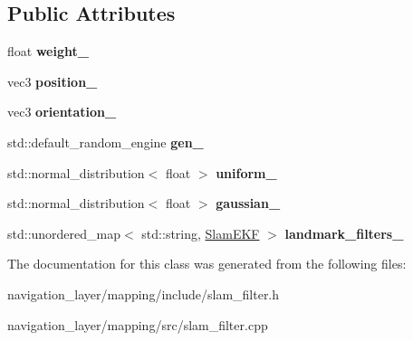 \subsection*{Public Attributes}
\begin{DoxyCompactItemize}
\item 
\mbox{\label{classmapping_1_1SlamParticle_aae4caa21a4aa9866bb63bddde3e16bb2}} 
float {\bfseries weight\+\_\+}
\item 
\mbox{\label{classmapping_1_1SlamParticle_a04c48dccf2bf33aa6761a38d9d289cef}} 
vec3 {\bfseries position\+\_\+}
\item 
\mbox{\label{classmapping_1_1SlamParticle_a989e2db13f8532c795ec423e70bd5133}} 
vec3 {\bfseries orientation\+\_\+}
\item 
\mbox{\label{classmapping_1_1SlamParticle_a498c90169a53f012cc2018bd6e2472f3}} 
std\+::default\+\_\+random\+\_\+engine {\bfseries gen\+\_\+}
\item 
\mbox{\label{classmapping_1_1SlamParticle_a8dd5b4d4a029b82c4e4277b76b49f625}} 
std\+::normal\+\_\+distribution$<$ float $>$ {\bfseries uniform\+\_\+}
\item 
\mbox{\label{classmapping_1_1SlamParticle_a89ab84cbc0100244aee0317dc62696a4}} 
std\+::normal\+\_\+distribution$<$ float $>$ {\bfseries gaussian\+\_\+}
\item 
\mbox{\label{classmapping_1_1SlamParticle_a0ca237f4f457d3b61b824c7912530502}} 
std\+::unordered\+\_\+map$<$ std\+::string, \hyperlink{classmapping_1_1SlamEKF}{Slam\+E\+KF} $>$ {\bfseries landmark\+\_\+filters\+\_\+}
\end{DoxyCompactItemize}


The documentation for this class was generated from the following files\+:\begin{DoxyCompactItemize}
\item 
navigation\+\_\+layer/mapping/include/slam\+\_\+filter.\+h\item 
navigation\+\_\+layer/mapping/src/slam\+\_\+filter.\+cpp\end{DoxyCompactItemize}

